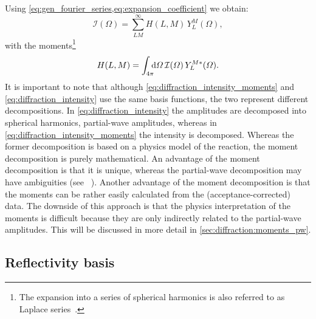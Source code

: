 Using \cref{eq:gen_fourier_series,eq:expansion_coefficient} we obtain:
\begin{equation}
  \label{eq:diffraction_intensity_moments}
  \mathcal{I}(\Omega)
  = \sum_{L M}^\infty H(L, M)\, Y_L^M(\Omega),
\end{equation}
with the moments\footnote{The expansion into a series of spherical
harmonics is also referred to as Laplace
series~\cite{MathWorld:LaplaceSeries}.}
\begin{equation}
  \label{eq:diffraction_moments}
  H(L, M)
  = \int_{4 \pi}\!\!\! \dif{\Omega}\, \mathcal{I}(\Omega)\, Y_L^{M *}(\Omega).
\end{equation}
It is important to note that although
\cref{eq:diffraction_intensity_moments} and
\cref{eq:diffraction_intensity} use the same basis functions, the two
represent different decompositions.  In
\cref{eq:diffraction_intensity} the amplitudes are decomposed into
spherical harmonics, \ie partial-wave amplitudes, whereas in
\cref{eq:diffraction_intensity_moments} the intensity is decomposed.
Whereas the former decomposition is based on a physics model of the
reaction, the moment decomposition is purely mathematical.  An
advantage of the moment decomposition is that it is unique, whereas
the partial-wave decomposition may have ambiguities (see \eg\
).  Another advantage of the moment
decomposition is that the moments can be rather easily calculated from
the (acceptance-corrected) data.  The downside of this approach is
that the physics interpretation of the moments is difficult because
they are only indirectly related to the partial-wave amplitudes.  This
will be discussed in more detail in \cref{sec:diffraction:moments_pw}.


\subsection{Reflectivity basis}%
\label{sec:diffraction:reflectivity}

